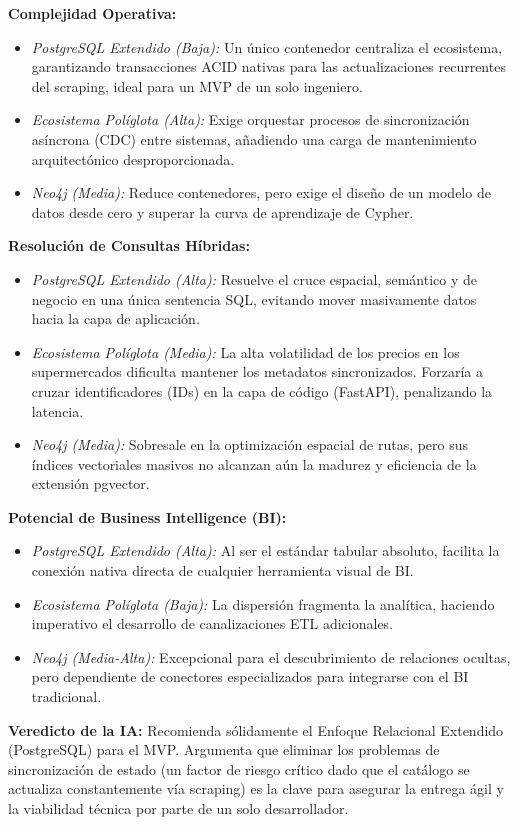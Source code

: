 \begin{tcolorbox}[colback=responsecolor, title=Insights de Gemini, colframe=gray!60!black, breakable]
	\textbf{Complejidad Operativa:}
	\begin{itemize}
		\item \textit{PostgreSQL Extendido (Baja):} Un único contenedor centraliza el ecosistema, garantizando transacciones ACID nativas para las actualizaciones recurrentes del scraping, ideal para un MVP de un solo ingeniero.
		\item \textit{Ecosistema Políglota (Alta):} Exige orquestar procesos de sincronización asíncrona (CDC) entre sistemas, añadiendo una carga de mantenimiento arquitectónico desproporcionada.
		\item \textit{Neo4j (Media):} Reduce contenedores, pero exige el diseño de un modelo de datos desde cero y superar la curva de aprendizaje de Cypher.
	\end{itemize}

	\textbf{Resolución de Consultas Híbridas:}
	\begin{itemize}
		\item \textit{PostgreSQL Extendido (Alta):} Resuelve el cruce espacial, semántico y de negocio en una única sentencia SQL, evitando mover masivamente datos hacia la capa de aplicación.
		\item \textit{Ecosistema Políglota (Media):} La alta volatilidad de los precios en los supermercados dificulta mantener los metadatos sincronizados. Forzaría a cruzar identificadores (IDs) en la capa de código (FastAPI), penalizando la latencia.
		\item \textit{Neo4j (Media):} Sobresale en la optimización espacial de rutas, pero sus índices vectoriales masivos no alcanzan aún la madurez y eficiencia de la extensión pgvector.
	\end{itemize}

	\textbf{Potencial de Business Intelligence (BI):}
	\begin{itemize}
		\item \textit{PostgreSQL Extendido (Alta):} Al ser el estándar tabular absoluto, facilita la conexión nativa directa de cualquier herramienta visual de BI.
		\item \textit{Ecosistema Políglota (Baja):} La dispersión fragmenta la analítica, haciendo imperativo el desarrollo de canalizaciones ETL adicionales.
		\item \textit{Neo4j (Media-Alta):} Excepcional para el descubrimiento de relaciones ocultas, pero dependiente de conectores especializados para integrarse con el BI tradicional.
	\end{itemize}

	\textbf{Veredicto de la IA:} Recomienda sólidamente el Enfoque Relacional Extendido (PostgreSQL) para el MVP. Argumenta que eliminar los problemas de sincronización de estado (un factor de riesgo crítico dado que el catálogo se actualiza constantemente vía scraping) es la clave para asegurar la entrega ágil y la viabilidad técnica por parte de un solo desarrollador.
\end{tcolorbox}

